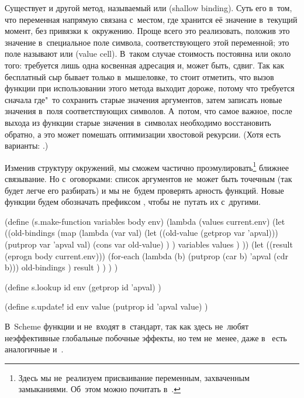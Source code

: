 Существует и другой метод, называемый  или  (shallow binding). Суть его в~том, что переменная напрямую связана
с~местом, где хранится её значение в~текущий момент, без привязки к~окружению.
Проще всего это реализовать, положив это значение в~специальное поле символа,
соответствующего этой переменной; это поле называют  или  (value cell). В~таком случае стоимость  постоянна или около
того: требуется лишь одна косвенная адресация и, может быть, сдвиг. Так как
бесплатный сыр бывает только в~мышеловке, то стоит отметить, что вызов функции
при использовании этого метода выходит дороже, потому что требуется сначала
где"~то сохранить старые значения аргументов, затем записать новые значения
в~поля соответствующих символов. А~потом, что самое важное, после выхода из
функции старые значения в~символах необходимо восстановить обратно, а это может
помешать оптимизации хвостовой рекурсии. (Хотя есть варианты: \cite{sj93}.)

Изменив структуру окружений, мы сможем частично проэмулировать\footnote{Здесь мы
не~реализуем присваивание переменным, захваченным замыканиями. Об~этом можно
почитать в~\cite{bcsj86}.} ближнее связывание. Но с~оговорками: список
аргументов не~может быть точечным (так будет легче его разбирать) и мы не~будем
проверять арность функций. Новые функции будем обозначать префиксом ,
чтобы не~путать их с~другими.

\begin{code:lisp}
(define (s.make-function variables body env)
  (lambda (values current.env)
    (let ((old-bindings
           (map (lambda (var val)
                  (let ((old-value (getprop var 'apval)))
                    (putprop var 'apval val)
                    (cons var old-value) ) )
                variables
                values ) ))
      (let ((result (eprogn body current.env)))
        (for-each (lambda (b) (putprop (car b) 'apval (cdr b)))
                  old-bindings )
        result ) ) ) )

(define s.lookup id env
  (getprop id 'apval) )

(define s.update! id env value
  (putprop id 'apval value) )
\end{code:lisp}

В~Scheme функции  и  не~входят в~стандарт, так как здесь
не~любят неэффективные глобальные побочные эффекты, но тем не~менее, даже
в~\cite{as85} есть аналогичные  и~.


